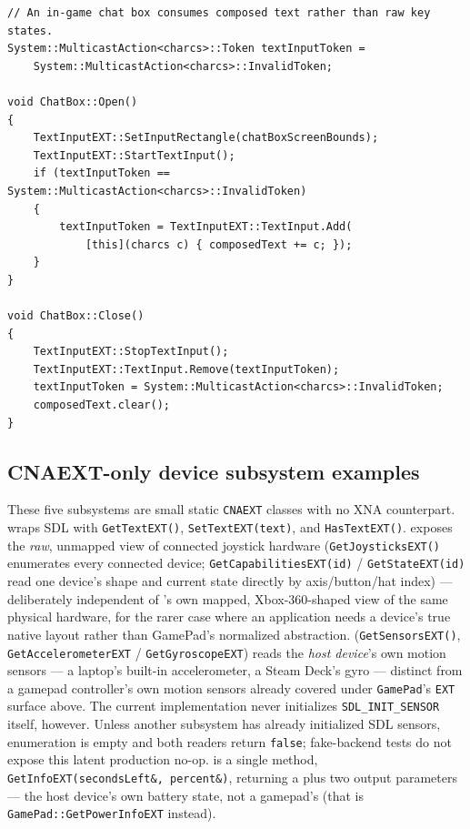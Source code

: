 \begin{lstlisting}
// An in-game chat box consumes composed text rather than raw key states.
System::MulticastAction<charcs>::Token textInputToken =
    System::MulticastAction<charcs>::InvalidToken;

void ChatBox::Open()
{
    TextInputEXT::SetInputRectangle(chatBoxScreenBounds);
    TextInputEXT::StartTextInput();
    if (textInputToken == System::MulticastAction<charcs>::InvalidToken)
    {
        textInputToken = TextInputEXT::TextInput.Add(
            [this](charcs c) { composedText += c; });
    }
}

void ChatBox::Close()
{
    TextInputEXT::StopTextInput();
    TextInputEXT::TextInput.Remove(textInputToken);
    textInputToken = System::MulticastAction<charcs>::InvalidToken;
    composedText.clear();
}
\end{lstlisting}

\subsection{CNAEXT-only device subsystem examples}

These five subsystems are small static \texttt{CNAEXT} classes with no XNA counterpart.
 wraps SDL with \texttt{GetTextEXT()}, \texttt{SetTextEXT(text)}, and
\texttt{HasTextEXT()}. 
exposes the \emph{raw}, unmapped view of connected joystick hardware
(\texttt{GetJoysticksEXT()} enumerates every connected device;
\texttt{GetCapabilitiesEXT(id)} / \texttt{GetStateEXT(id)} read one device's shape and current
state directly by axis/button/hat index) --- deliberately independent of 's
own mapped, Xbox-360-shaped view of the same physical hardware, for the rarer case where an
application needs a device's true native layout rather than GamePad's normalized
abstraction.  (\texttt{GetSensorsEXT()},
\texttt{GetAccelerometerEXT} / \texttt{GetGyroscopeEXT}) reads the \emph{host device}'s own
motion sensors --- a laptop's built-in accelerometer, a Steam Deck's gyro --- distinct from a
gamepad controller's own motion sensors already covered under \texttt{GamePad}'s
\texttt{EXT} surface above. The current implementation never initializes
\texttt{SDL\_INIT\_SENSOR} itself, however. Unless another subsystem has already initialized
SDL sensors, enumeration is empty and both readers return \texttt{false}; fake-backend tests do
not expose this latent production no-op.  is a single method,
\texttt{GetInfoEXT(secondsLeft\&, percent\&)}, returning a  plus two
output parameters --- the host device's own battery state, not a gamepad's (that is
\texttt{GamePad::GetPowerInfoEXT} instead).

